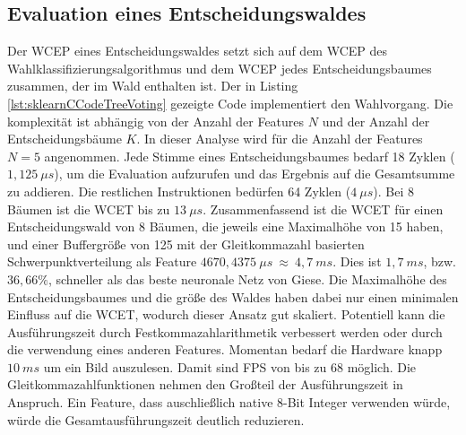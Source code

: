 \subsection{Evaluation eines Entscheidungswaldes}
Der WCEP eines Entscheidungswaldes setzt sich auf dem WCEP des Wahlklassifizierungsalgorithmus und dem WCEP jedes Entscheidungsbaumes zusammen, der im Wald enthalten ist.
\newline
\newline
Der in Listing \ref{lst:sklearnCCodeTreeVoting} gezeigte Code implementiert den Wahlvorgang. Die komplexität ist abhängig von der Anzahl der Features $N$ und der Anzahl der Entscheidungsbäume $K$. In
dieser Analyse wird für die Anzahl der Features $N=5$ angenommen.
\newline
\newline
Jede Stimme eines Entscheidungsbaumes bedarf 18 Zyklen ($1,125\ \mu s$), um die Evaluation aufzurufen und das Ergebnis auf die Gesamtsumme zu addieren. Die restlichen Instruktionen bedürfen 64 Zyklen
($4\ \mu s$). Bei 8 Bäumen ist die WCET bis zu $13\ \mu s$.
\newline
\newline
Zusammenfassend ist die WCET für einen Entscheidungswald von 8 Bäumen, die jeweils eine Maximalhöhe von 15 haben, und einer Buffergröße von 125 mit der Gleitkommazahl basierten Schwerpunktverteilung als Feature
$4670,4375\ \mu s\ \approx\ 4,7\ ms$. Dies ist $1,7\ ms$, bzw. $36,66\%$, schneller als das beste neuronale Netz von Giese. Die Maximalhöhe des Entscheidungsbaumes und die größe des Waldes haben dabei nur
einen minimalen Einfluss auf die WCET, wodurch dieser Ansatz gut skaliert.
\newline
\newline
Potentiell kann die Ausführungszeit durch Festkommazahlarithmetik verbessert werden oder durch die verwendung eines anderen Features. Momentan bedarf die Hardware knapp $10\ ms$ um ein Bild auszulesen. Damit
sind FPS von bis zu 68 möglich.
\newline
\newline
Die Gleitkommazahlfunktionen nehmen den Großteil der Ausführungszeit in Anspruch. Ein Feature, dass auschließlich native 8-Bit Integer verwenden würde, würde die Gesamtausführungszeit deutlich reduzieren.